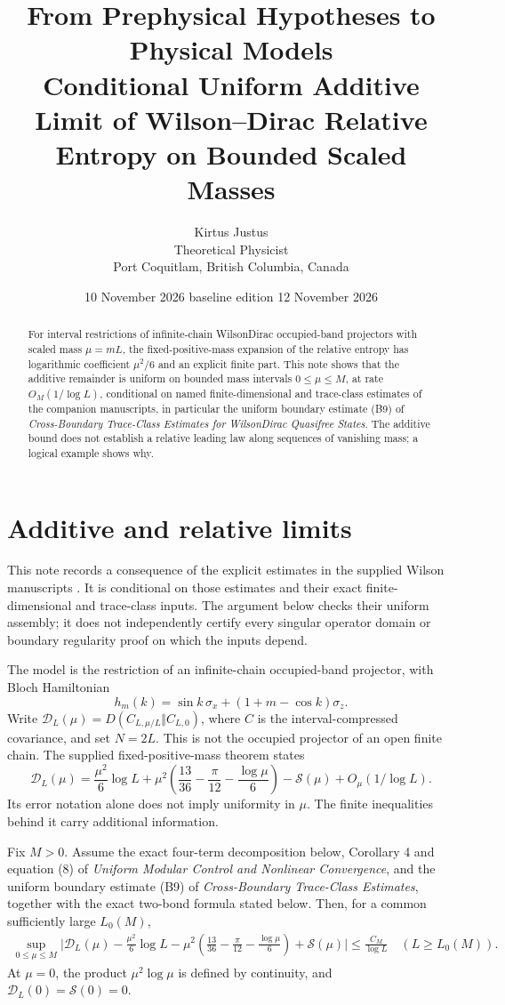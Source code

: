 \documentclass[11pt,a4paper]{article}
\title{\color{ink}\sffamily\large From Prephysical Hypotheses to Physical Models\\[9pt]\LARGE Conditional Uniform Additive Limit of Wilson--Dirac Relative Entropy on Bounded Scaled Masses}
\author{Kirtus Justus\\\small Theoretical Physicist\\\small Port Coquitlam, British Columbia, Canada}
\date{10 November 2026 \textperiodcentered{} baseline edition 12 November 2026}
\theoremstyle{definition}\newtheorem{definition}[theorem]{Definition}
\begin{document}
\maketitle
\begin{abstract}
For interval restrictions of infinite-chain Wilson\textendash Dirac occupied-band projectors with scaled mass $\mu=mL$, the fixed-positive-mass expansion of the relative entropy has logarithmic coefficient $\mu^2/6$ and an explicit finite part. This note shows that the additive remainder is uniform on bounded mass intervals $0\le\mu\le M$, at rate $O_M(1/\log L)$, conditional on named finite-dimensional and trace-class estimates of the companion manuscripts, in particular the uniform boundary estimate (B9) of \emph{Cross-Boundary Trace-Class Estimates for Wilson\textendash Dirac Quasifree States}. The additive bound does not establish a relative leading law along sequences of vanishing mass; a logical example shows why.
\end{abstract}

\section{Additive and relative limits}\label{sec:wilson}

This note records a consequence of the explicit estimates in the supplied Wilson manuscripts \cite{wilson}. It is conditional on those estimates and their exact finite-dimensional and trace-class inputs. The argument below checks their uniform assembly; it does not independently certify every singular operator domain or boundary regularity proof on which the inputs depend.

The model is the restriction of an infinite-chain occupied-band projector, with Bloch Hamiltonian
\[
h_m(k)=\sin k\,\sigma_x+(1+m-\cos k)\sigma_z.
\]
Write $\mathcal D_L(\mu)=D(C_{L,\mu/L}\Vert C_{L,0})$, where $C$ is the interval-compressed covariance, and set $N=2L$. This is not the occupied projector of an open finite chain. The supplied fixed-positive-mass theorem states
\[
\mathcal D_L(\mu)=\frac{\mu^2}{6}\log L+
\mu^2\left(\frac{13}{36}-\frac\pi{12}-\frac{\log\mu}{6}\right)
-\mathcal S(\mu)+O_\mu(1/\log L).
\]
Its error notation alone does not imply uniformity in $\mu$. The finite inequalities behind it carry additional information.

\begin{proposition}\label{prop:wilson}
Fix $M>0$. Assume the exact four-term decomposition below, Corollary 4 and equation (8) of \emph{Uniform Modular Control and Nonlinear Convergence}, and the uniform boundary estimate (B9) of \emph{Cross-Boundary Trace-Class Estimates}, together with the exact two-bond formula stated below. Then, for a common sufficiently large $L_0(M)$,
\begin{align*}
\sup_{0\le\mu\le M}\Bigg|\mathcal D_L(\mu)
-\frac{\mu^2}{6}\log L
-\mu^2\left(\frac{13}{36}-\frac\pi{12}-\frac{\log\mu}{6}\right)
+\mathcal S(\mu)\Bigg|
\le \frac{C_M}{\log L}\quad(L\ge L_0(M)).
\end{align*}
At $\mu=0$, the product $\mu^2\log\mu$ is defined by continuity, and $\mathcal D_L(0)=\mathcal S(0)=0$.
\end{proposition}
\end{document}
